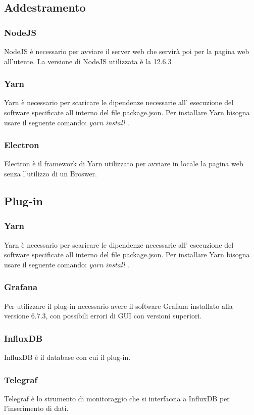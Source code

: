 \documentclass[../manuale-sviluppatore.tex]{subfiles}
\begin{document}
\subsection{Addestramento}%
\label{subs:addestramento}

\subsubsection{NodeJS}
\label{sssec:nodejs}
     NodeJS è necessario per avviare il server web che servirà poi per la pagina web all'utente. La versione di NodeJS utilizzata è la 12.6.3 

\subsubsection{Yarn}
\label{sssec:yarn}
    Yarn è necessario per scaricare le dipendenze necessarie all' esecuzione del software specificate all interno del file package.json. Per installare Yarn bisogna usare il seguente comando: \emph{yarn install} .
    
\subsubsection{Electron}
\label{sssec:electron}
    Electron è il framework di Yarn utilizzato per avviare in locale la pagina web senza l'utilizzo di un Broswer.
     
\subsection{Plug-in}%
\label{subs:plug_in}

\subsubsection{Yarn}
\label{sssec:yarn}
    Yarn è necessario per scaricare le dipendenze necessarie all' esecuzione del software specificate all interno del file package.json. Per installare Yarn bisogna usare il seguente comando: \emph{yarn install} .
    
\subsubsection{Grafana}
\label{sssec:grafana}
    Per utilizzare il plug-in necessario avere il software Grafana installato alla versione 6.7.3, con possibili errori di GUI con versioni superiori.
    
\subsubsection{InfluxDB}
\label{sssec:influxdb}
    InfluxDB è il database con cui il plug-in.
    
\subsubsection{Telegraf}
\label{sssec:telegraf}
    Telegraf è lo strumento di monitoraggio che si interfaccia a InfluxDB per l'inserimento di dati.
\end{document}
